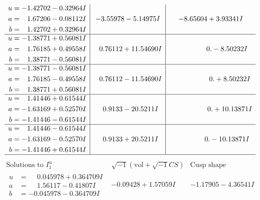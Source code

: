 \documentclass[1p]{elsarticle_modified}
\theoremstyle{definition}
\newcommand{\I}{\sqrt{-1}}
\begin{document}
$$\begin{array}{c|c|c}
\begin{aligned}
u &= -1.42702 - 0.32964 I \\
a &= \phantom{-}1.67206 - 0.08112 I \\
b &= \phantom{-}1.42702 + 0.32964 I\end{aligned}
 & -3.55978 - 5.14975 I & -8.65604 + 3.93341 I \\ \hline\begin{aligned}
u &= -1.38771 + 0.56081 I \\
a &= \phantom{-}1.76185 + 0.49558 I \\
b &= \phantom{-}1.38771 - 0.56081 I\end{aligned}
 & \phantom{-}0.76112 + 11.54690 I & \phantom{-0.000000 } 0. - 8.50232 I \\ \hline\begin{aligned}
u &= -1.38771 - 0.56081 I \\
a &= \phantom{-}1.76185 - 0.49558 I \\
b &= \phantom{-}1.38771 + 0.56081 I\end{aligned}
 & \phantom{-}0.76112 - 11.54690 I & \phantom{-0.000000 -}0. + 8.50232 I \\ \hline\begin{aligned}
u &= \phantom{-}1.41446 + 0.61544 I \\
a &= -1.63169 + 0.52570 I \\
b &= -1.41446 - 0.61544 I\end{aligned}
 & \phantom{-}0.9133 - 20.5211 I & \phantom{-0.000000 -}0. + 10.13871 I \\ \hline\begin{aligned}
u &= \phantom{-}1.41446 - 0.61544 I \\
a &= -1.63169 - 0.52570 I \\
b &= -1.41446 + 0.61544 I\end{aligned}
 & \phantom{-}0.9133 + 20.5211 I & \phantom{-0.000000 } 0. - 10.13871 I\\
 \hline 
 \end{array}$$\newpage$$\begin{array}{c|c|c}  
\text{Solutions to }I^u_{1}& \I (\text{vol} + \sqrt{-1}CS) & \text{Cusp shape}\\
 \hline 
\begin{aligned}
u &= \phantom{-}0.045978 + 0.364709 I \\
a &= \phantom{-}1.56117 - 0.41807 I \\
b &= -0.045978 - 0.364709 I\end{aligned}
 & -0.09428 + 1.57059 I & -1.17905 - 4.36541 I \\ \hline\begin{aligned}

\end{aligned}
\end{array}$$
\end{document}
